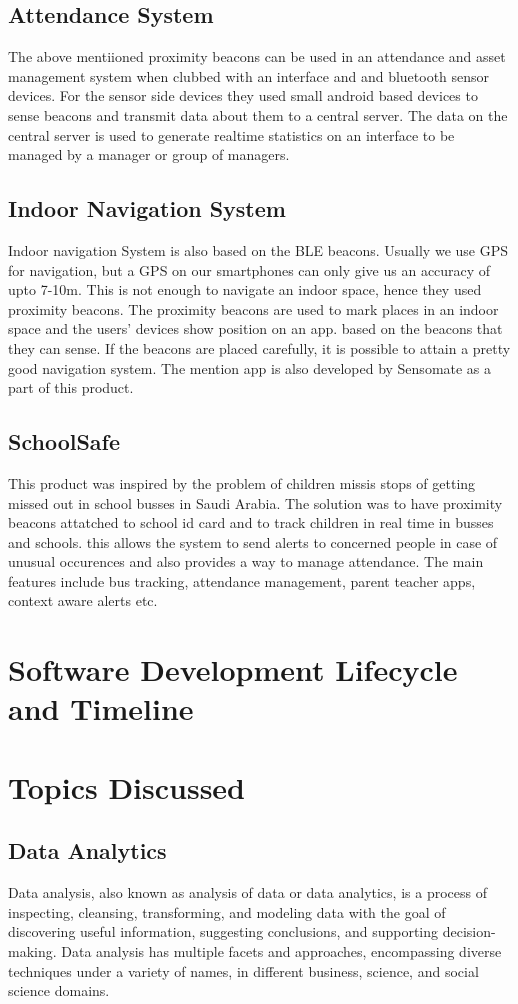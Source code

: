 \documentclass[a4paper,12pt]{report}
\begin{document}
			\subsection{Attendance System}
			The above mentiioned proximity beacons can be used in an attendance and asset management system when clubbed with an interface and and bluetooth sensor devices. For the sensor side devices they used small android based devices to sense beacons and transmit data about them to a central server. The data on the central server is used to generate realtime statistics on an interface to be managed by a manager or group of managers.
			\subsection{Indoor Navigation System}
			Indoor navigation System is also based on the BLE beacons. Usually we use GPS for navigation, but a GPS on our smartphones can only give us an accuracy of upto 7-10m. This is not enough to navigate an indoor space, hence they used proximity beacons. The proximity beacons are used to mark places in an indoor space and the users' devices show position on an app. based on the beacons that they can sense. If the beacons are placed carefully, it is possible to attain a pretty good navigation system. The mention app is also developed by Sensomate as a part of this product.
			\subsection{SchoolSafe}
			This product was inspired by the problem of children missis stops of getting missed out in school busses in Saudi Arabia. The solution was to have proximity beacons attatched to school id card and to track children in real time in busses and schools. this allows the system to send alerts to concerned people in case of unusual occurences and also provides a way to manage attendance. The main features include bus tracking, attendance management, parent teacher apps, context aware alerts etc.   
		\section{Software Development Lifecycle and Timeline}
		\section{Topics Discussed}
			\subsection{Data Analytics}
			Data analysis, also known as analysis of data or data analytics, is a process of inspecting, cleansing, transforming, and modeling data with the goal of discovering useful information, suggesting conclusions, and supporting decision-making. Data analysis has multiple facets and approaches, encompassing diverse techniques under a variety of names, in different business, science, and social science domains.
\end{document}
